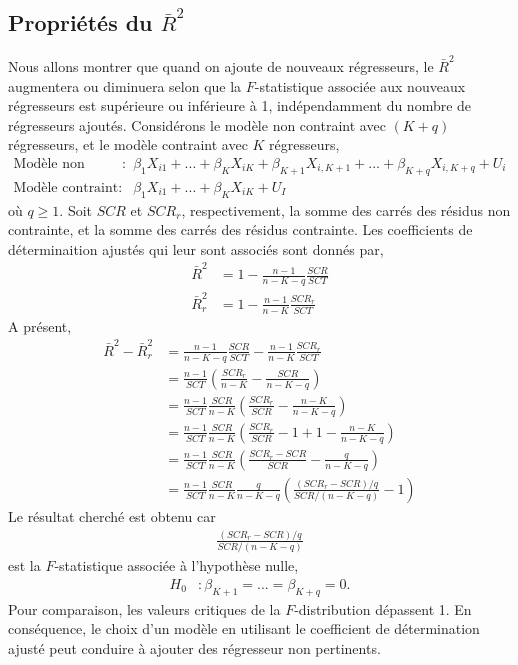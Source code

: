 \subsection{Propriétés du $\bar{R}^2$}
Nous allons montrer que quand on  ajoute de nouveaux régresseurs, le $\bar{R}^2$ augmentera ou diminuera selon que la $F$-statistique associée aux nouveaux régresseurs est supérieure ou inférieure à 1, indépendamment du nombre de régresseurs ajoutés. Considérons le modèle non contraint avec $(K+q)$ régresseurs, et le modèle contraint avec $K$ régresseurs,
\begin{align*}
\textrm{Modèle non contraint}: & \beta_1X_{i1} + ...+\beta_KX_{iK} + \beta_{K+1}X_{i,K+1} +  ...+\beta_{K+q}X_{i,K+q} + U_i\\
\textrm{Modèle contraint}: &  \beta_1X_{i1} +...+\beta_KX_{iK} + U_I
\end{align*}
où $q\geq 1$. Soit $SCR$ et $SCR_r$, respectivement, la somme des carrés des résidus non contrainte, et la somme des carrés des résidus contrainte. Les coefficients de déterminaition ajustés qui leur sont associés sont donnés par,
\begin{align*}
\bar{R}^2 &= 1 - \frac{n-1}{n-K-q}\frac{SCR}{SCT}\\
\bar{R}^2_r &= 1 - \frac{n-1}{n-K}\frac{SCR_r}{SCT}
\end{align*}
A présent,
\begin{align*}
\bar{R}^2 - \bar{R}^2_r &= \frac{n-1}{n-K-q}\frac{SCR}{SCT} - \frac{n-1}{n-K}\frac{SCR_r}{SCT}\\
&= \frac{n-1}{SCT}\left(\frac{SCR_r}{n-K} - \frac{SCR}{n-K-q}\right)\\
&=\frac{n-1}{SCT}\frac{SCR}{n-K}\left(\frac{SCR_r}{SCR} - \frac{n-K}{n-K-q}\right)\\
&=\frac{n-1}{SCT}\frac{SCR}{n-K}\left(\frac{SCR_r}{SCR} -1+1- \frac{n-K}{n-K-q}\right)\\
&=\frac{n-1}{SCT}\frac{SCR}{n-K}\left(\frac{SCR_r - SCR}{SCR} - \frac{q}{n-K-q}\right)\\
&=\frac{n-1}{SCT}\frac{SCR}{n-K} \frac{q}{n-K-q}\left(\frac{(SCR_r - SCR)/q}{SCR/(n-K-q)} - 1\right)
\end{align*}
Le résultat cherché est obtenu car 
\begin{align*} 
\frac{(SCR_r - SCR)/q}{SCR/(n-K-q)}
\end{align*}
est la $F$-statistique associée à l'hypothèse nulle,
\begin{align*}
H_0&:\beta_{K+1}=...=\beta_{K+q}=0.
\end{align*}
Pour comparaison, les valeurs critiques de la $F$-distribution dépassent 1. En conséquence, le choix d'un  modèle en utilisant le coefficient de détermination ajusté peut conduire à ajouter des régresseur non pertinents.

